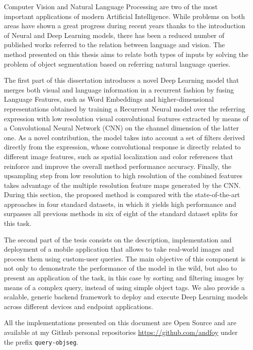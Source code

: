 
Computer Vision and Natural Language Processing are two of the most important applications of modern Artificial Intelligence. While problems on both areas have shown a great progress during recent years thanks to the introduction of Neural and Deep Learning models, there has been a reduced number of published works referred to the relation between language and vision. The method presented on this thesis aims to relate both types of inputs by solving the problem of object segmentation based on referring natural language queries.

The first part of this dissertation introduces a novel Deep Learning model that merges both visual and language information in a recurrent fashion by fusing Language Features, such as Word Embeddings and higher-dimensional representations obtained by training a Recurrent Neural model over the referring expression with low resolution visual convolutional features extracted by means of a Convolutional Neural Network (CNN) on the channel dimension of the latter one. As a novel contribution, the model takes into account a set of filters derived directly from the expression, whose convolutional response is directly related to different image features, such as spatial localization and color references that reinforce and improve the overall method performance accuracy. Finally, the upsampling step from low resolution to high resolution of the combined features takes advantage of the multiple resolution feature maps generated by the CNN. During this section, the proposed method is compared with the state-of-the-art approaches in four standard datasets, in which it yields high performance and surpasses all previous methods in six of eight of the standard dataset splits for this task.    

The second part of the tesis consists on the description, implementation and deployment of a mobile application that allows to take real-world images and process them using custom-user queries. The main objective of this component is not only to demonstrate the performance of the model in the wild, but also to present an application of the task, in this case by sorting and filtering images by means of a complex query, instead of using simple object tags. We also provide a scalable, generic backend framework to deploy and execute Deep Learning models across different devices and endpoint applications. 

All the implementations presented on this document are Open Source and are available at my Github personal repositories \url{https://github.com/andfoy} under the prefix \texttt{query-objseg}.


